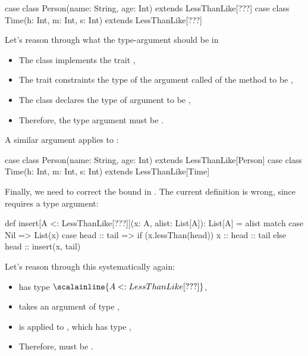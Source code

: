 \documentclass{book}
\begin{document}
\begin{scalacode}
case class Person(name: String, age: Int) extends LessThanLike[???]
case class Time(h: Int, m: Int, s: Int) extends LessThanLike[???]
\end{scalacode}

Let's reason through what the type-argument should be in 
\begin{itemize}

  \item The class  implements the trait ,

  \item The trait constraints the type of the argument called 
  of the method  to be ,

  \item The class declares the type of  argument to be
  ,

  \item Therefore, the type argument must be .
\end{itemize}
A similar argument applies to :

\begin{scalacode}
case class Person(name: String, age: Int) extends LessThanLike[Person]
case class Time(h: Int, m: Int, s: Int) extends LessThanLike[Time]
\end{scalacode}

Finally, we need to correct the bound in . The
current definition is wrong, since  requires
a type argument:
%
\begin{scalacode}
def insert[A <: LessThanLike[???]](x: A, alist: List[A]): List[A] = alist match {
  case Nil => List(x)
  case head :: tail => {
    if (x.lessThan(head)) {
      x :: head :: tail
    }
    else {
      head :: insert(x, tail)
    }
  }
}
\end{scalacode}
%
Let's reason through this systematically again:
%
\begin{itemize}

  \item {} has type $\scalainline{A <: LessThanLike[???]}$,

  \item {} takes an argument of type ,

  \item {} is applied to , which has
  type ,

  \item Therefore,  must be .

\end{itemize}
\end{document}
